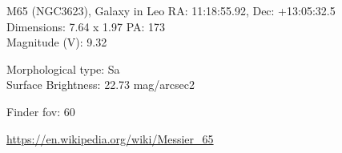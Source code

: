 \begin{block}{M65 (NGC3623), Galaxy in Leo}
    RA: 11:18:55.92, Dec: +13:05:32.5 \\ 
    Dimensions: 7.64 x 1.97 PA: 173 \\ 
    Magnitude (V): 9.32

    Morphological type: Sa \\ 
    Surface Brightness: 22.73 mag/arcsec2 


    Finder fov: 60 

    \url{https://en.wikipedia.org/wiki/Messier_65} 
\end{block}
